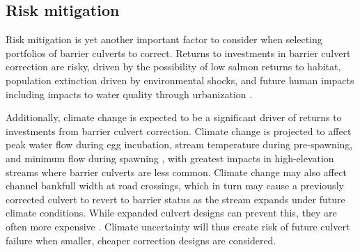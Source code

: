 \documentclass[12pt]{elsarticle}
\begin{document}
\subsection*{Risk mitigation}

Risk mitigation is yet another important factor to consider when selecting portfolios of barrier culverts to correct. Returns to investments in barrier culvert correction are risky, driven by the possibility of low salmon returns to habitat, population extinction driven by environmental shocks, and future human impacts including impacts to water quality through urbanization \citep{ettinger_prioritizing_2021}. 

Additionally, climate change is expected to be a significant driver of returns to investments from barrier culvert correction. Climate change is projected to affect peak water flow during egg incubation, stream temperature during pre-spawning, and minimum flow during spawning \citep{battin_projected_2007}, with greatest impacts in high-elevation streams where barrier culverts are less common. Climate change may also affect channel bankfull width at road crossings, which in turn may cause a previously corrected culvert to revert to barrier status as the stream expands under future climate conditions. While expanded culvert designs can prevent this, they are often more expensive \cite{guillaume_mauger_climate_nodate}. Climate uncertainty will thus create risk of future culvert failure when smaller, cheaper correction designs are considered. 
\end{document}
